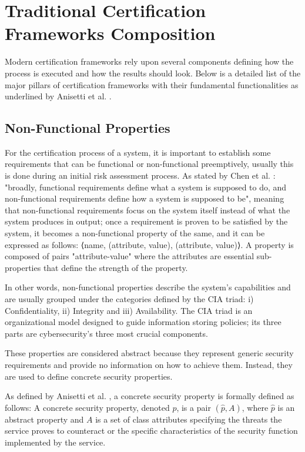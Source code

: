 

\section{Traditional Certification Frameworks Composition}
Modern certification frameworks rely upon several components defining how the process is executed and how the results should look. Below is a detailed list of the major pillars of certification frameworks with their fundamental functionalities as underlined by Anisetti et al. \cite{anisetti2017semi}\cite{anisetti2022multi}.

\subsection{Non-Functional Properties}
For the certification process of a system, it is important to establish some requirements that can be functional or non-functional preemptively, usually this is done during an initial risk assessment process. As stated by Chen et al. \cite{chen2013verification}: "broadly, functional requirements define what a system is supposed to do, and non-functional requirements define how a system is supposed to be", meaning that non-functional requirements focus on the system itself instead of what the system produces in output; once a requirement is proven to be satisfied by the system, it becomes a non-functional property of the same, and it can be expressed as follows: ⟨name, {(attribute, value), (attribute, value)}⟩. A property is composed of pairs "attribute-value" where the attributes are essential sub-properties that define the strength of the property.

In other words, non-functional properties describe the system's capabilities and are usually grouped under the categories defined by the CIA triad: i) Confidentiality, ii) Integrity and iii) Availability. The CIA triad is an organizational model designed to guide information storing policies; its three parts are cybersecurity's three most crucial components.

These properties are considered abstract because they represent generic security requirements and provide no information on how to achieve them. Instead, they are used to define concrete security properties. 

As defined by Anisetti et al. \cite{anisetti2013test}, a concrete security property is formally defined as follows:
A concrete security property, denoted \(p\), is a pair \( ( \hat{p}, A) \), where \(\hat{p}\) is an abstract property and \(A\) is a set of class attributes specifying the threats the service proves to counteract or the specific characteristics of the security function implemented by the service.

